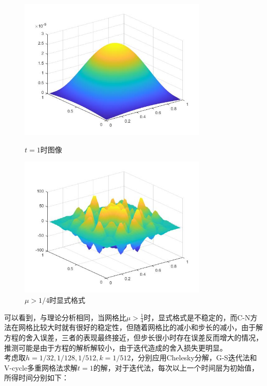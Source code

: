 \documentclass[12pt]{ctexart}
\begin{document}
\begin{figure}[H]
	\centering
	\begin{minipage}[t]{0.48\textwidth}
		\centering
		\includegraphics[width=9cm]{热扩散.jpg}
		\caption{$t=1$时图像}
	\end{minipage}
	\begin{minipage}[t]{0.48\textwidth}
		\centering
		\includegraphics[width=9cm]{显式不稳定.jpg}
		\caption{$\mu>1/4$时显式格式}
	\end{minipage}
\end{figure}

\noindent 可以看到，与理论分析相同，当网格比$\mu > \frac{1}{4}$时，显式格式是不稳定的，而C-N方法在网格比较大时就有很好的稳定性，但随着网格比的减小和步长的减小，由于解方程的舍入误差，三者的表现最终接近，但步长很小时存在误差反而增大的情况，推测可能是由于方程的解析解较小，由于迭代造成的舍入损失更明显。\\
\indent 考虑取$h = 1/32,1/128,1/512,k = 1/512$，分别应用Chelesky分解，G-S迭代法和V-cycle多重网格法求解$t=1$的解，对于迭代法，每次以上一个时间层为初始值，所得时间分别如下：\\
\end{document}
